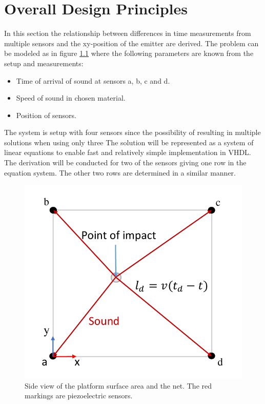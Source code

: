\chapter{Overall Design Principles} %
\label{chap:overall_design_principles}
	In this section the relationship between differences in time measurements from multiple sensors and the xy-position of the emitter are derived.	
	The problem can be modeled as in figure \ref{fig:tdoa_model} where the following parameters are known from the setup and measurements:
	\begin{itemize}
		\item Time of arrival of sound at sensors a, b, c and d.
		\item Speed of sound in chosen material.
		\item Position of sensors.
	\end{itemize}
	The system is setup with four sensors since the possibility of resulting in multiple solutions when using only three \cite{tdoa_book}
	The solution will be represented as a system of linear equations to enable fast and relatively simple implementation in VHDL.
	The derivation will be conducted for two of the sensors giving one row in the equation system. The other two rows are determined in a similar manner.
	\begin{figure}[htb]
		\centering
		\includegraphics[width=.6\textwidth]{figures/tdoa_model}
		\caption{Side view of the platform surface area and the net. The red markings are piezoelectric sensors.}
		\label{fig:tdoa_model}
	\end{figure}

